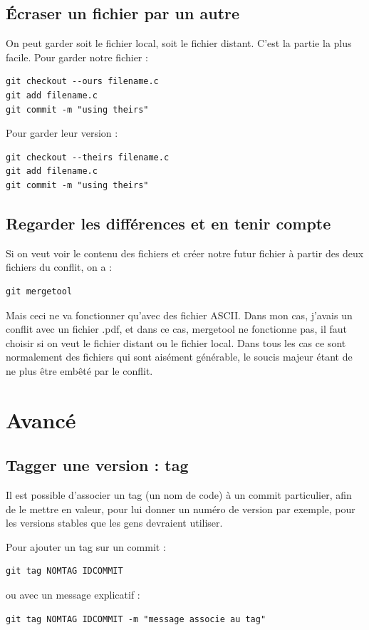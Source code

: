 \documentclass[a4paper,twoside]{article}
\begin{document}
\subsection{Écraser un fichier par un autre}
On peut garder soit le fichier local, soit le fichier distant. C'est la partie la plus facile. Pour garder notre fichier :
\begin{verbatim}
git checkout --ours filename.c
git add filename.c
git commit -m "using theirs"
\end{verbatim}

Pour garder leur version :
\begin{verbatim}
git checkout --theirs filename.c
git add filename.c
git commit -m "using theirs"
\end{verbatim}

\subsection{Regarder les différences et en tenir compte}
Si on veut voir le contenu des fichiers et créer notre futur fichier à partir des deux fichiers du conflit, on a :
\begin{verbatim}
git mergetool
\end{verbatim}

Mais ceci ne va fonctionner qu'avec des fichier ASCII. Dans mon cas, j'avais un conflit avec un fichier .pdf, et dans ce cas, mergetool ne fonctionne pas, il faut choisir si on veut le fichier distant ou le fichier local. Dans tous les cas ce sont normalement des fichiers qui sont aisément générable, le soucis majeur étant de ne plus être embêté par le conflit.


\section{Avancé}
\subsection{Tagger une version : tag}
Il est possible d'associer un tag (un nom de code) à un commit particulier, afin de le mettre en valeur, pour lui donner un numéro de version par exemple, pour les versions stables que les gens devraient utiliser.

Pour ajouter un tag sur un commit :
\begin{verbatim}
git tag NOMTAG IDCOMMIT
\end{verbatim}
ou avec un message explicatif :
\begin{verbatim}
git tag NOMTAG IDCOMMIT -m "message associe au tag"
\end{verbatim}
\end{document}

